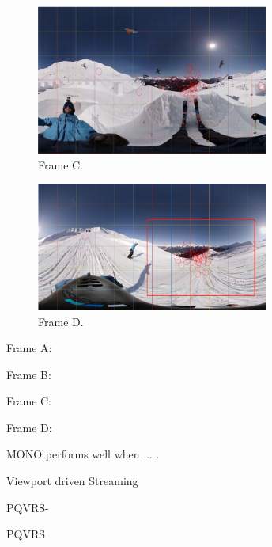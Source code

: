   \begin{figure}
  \centering
  \includegraphics[width=3in]{images/case3.png}
  \caption{Frame C.}
  \label{referencename}
  \end{figure}
  
  \begin{figure}
  \centering
  \includegraphics[width=3in]{images/case4.png}
  \caption{Frame D.}
  \label{referencename}
  \end{figure}

Frame A: 

Frame B: 

Frame C: 

Frame D: 

MONO performs well when ... .

Viewport driven Streaming

PQVRS-

PQVRS